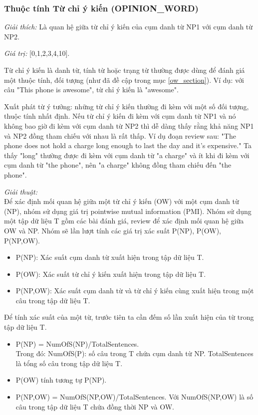 \documentclass[12pt]{extarticle}
\begin{document}
			\subsubsection*{Thuộc tính Từ chỉ ý kiến (OPINION\_WORD)}
				\par \textit{Giải thích:} Là quan hệ giữa từ chỉ ý kiến của cụm danh từ NP1 với cụm danh từ NP2.
				\par \textit{Giá trị:} [0,1,2,3,4,10]. 
				\par Từ chỉ ý kiến là danh từ, tính từ hoặc trạng từ thường được dùng để đánh giá một thuộc tính, đối tượng (như đã đề cập trong mục \ref{ow_section}). Ví dụ: với câu "This phone is awesome", từ chỉ ý kiến là "awesome".
				\par Xuất phát từ ý tưởng: những từ chỉ ý kiến thường đi kèm với một số đối tượng, thuộc tính nhất định. Nếu từ chỉ ý kiến đi kèm với cụm danh từ NP1 và nó không bao giờ đi kèm với cụm danh từ NP2 thì dễ dàng thấy rằng khả năng NP1 và NP2 đồng tham chiếu với nhau là rất thấp. Ví dụ đoạn review sau: "The phone does not hold a charge long enough to last the day and it’s expensive." Ta thấy "long" thường được đi kèm với cụm danh từ "a charge" và ít khi đi kèm với cụm danh từ "the phone", nên "a charge" không đồng tham chiếu đến "the phone".
				\par \textit{Giải thuật:}
				\\Để xác định mối quan hệ giữa một từ chỉ ý kiến (OW) với một cụm danh từ (NP), nhóm sử dụng giá trị pointwise mutual information (PMI). Nhóm sử dụng một tập dữ liệu T gồm các bài đánh giá, review để xác định mối quan hệ giữa OW và NP. Nhóm sẽ lần lượt tính các giá trị xác suất P(NP), P(OW), P(NP,OW).
				\begin{itemize} 
					\item{P(NP): Xác suất cụm danh từ xuất hiện trong tập dữ liệu T.}
					\item{P(OW): Xác suất từ chỉ ý kiến xuất hiện trong tập dữ liệu T.}
					\item{P(NP,OW): Xác suất cụm danh từ và từ chỉ ý kiến cùng xuất hiện trong một câu trong tập dữ liệu T.}
				\end{itemize}
				\par Để tính xác suất của một từ, trước tiên ta cần đếm số lần xuất hiện của từ trong tập dữ liệu T.
				\begin{itemize}
					\item{P(NP) = NumOfS(NP)/TotalSentences.
					\\Trong đó: NumOfS(P): số câu trong T chứa cụm danh từ NP. TotalSentences là tổng số câu trong tập dữ liệu T.}
					\item{P(OW) tính tương tự P(NP).}
					\item{P(NP,OW) = NumOfS(NP,OW)/TotalSentences. Với NumOfS(NP,OW) là số câu trong tập dữ liệu T chứa đồng thời NP và OW.}
				\end{itemize}
\end{document}
